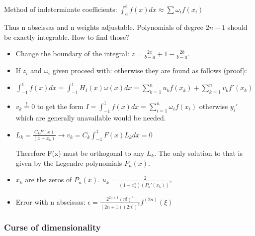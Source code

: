 \documentclass[8pt,a4paper]{scrartcl}
\renewcommand{\compaq}{\setlength{\itemsep}{0mm}\setlength{\parskip}{0cm}}
\begin{document}
\begin{multicols*}{3}

Method of indeterminate coefficients: $\int_a^bf(x)dx\approx \sum \omega_i f(x_i)$

Thus n abscissas and n weights adjustable. Polynomials of degree $2n-1$ should be exactly integrable. How to find those?

\begin{itemize}\compaq
\item Change the boundary of the integral: $z = \frac{2x}{b-a} + 1 - \frac{2b}{b-a}$.
\item If $z_i$ and $\omega_i$ given proceed with:
otherwise they are found as follows (proof):
\item $\int_{-1}^1f(x)dx=\int_{-1}^1H_I(x)\omega(x)dx=\sum\limits_{k=1}^nu_kf(x_k)+\sum\limits_{k=1}^nv_kf'(x_k)$
\item $v_k\overset{!}{=}0$ to get the form $I=\int_{-1}^1f(x)dx=\sum\limits_{i=1}^n\omega_if(x_i)$ otherwise $y_i'$ which are generally unavailable would be needed.
\item $L_k=\frac{C_kF(x)}{(x-x_k)}\rightarrow v_k=C_k\int_{-1}^1F(x)L_kdx=0$


Therefore F(x) must be orthogonal to any $L_k$. The only solution to that is given by the Legendre polynomials $P_n(x)$.


\item $x_k$ are the zeros of $P_n(x)$. $u_k=\frac{2}{(1-x_k^2)(P_n'(x_k))^2}$


\item Error with n abscissas: $\epsilon=\frac{2^{2n+1}(n!)^4}{(2n+1)(2n!)^3}f^{(2n)}(\xi)$
\end{itemize}

\subsubsection{Curse of dimensionality}


\end{multicols*}
\end{document}
